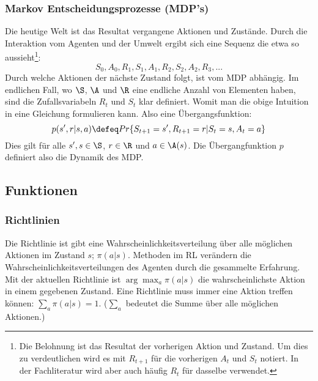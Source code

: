 \documentclass[a4paper,titlepage]{article}
\numberwithin{equation}{section} %
\begin{document}
\subsubsection{Markov Entscheidungsprozesse (MDP's)}
Die heutige Welt ist das Resultat vergangene Aktionen und Zustände. Durch die Interaktion vom Agenten und der Umwelt ergibt sich eine Sequenz die etwa so aussieht\footnote{Die Belohnung ist das Resultat der vorherigen Aktion und Zustand. Um dies zu verdeutlichen wird es mit $R_{t+1}$ für die vorherigen $A_t$ und $S_t$ notiert. In der Fachliteratur wird aber auch häufig $R_t$ für dasselbe verwendet.}:
\begin{equation} \label{eqn:sequenz}
S_{0}, A_{0}, R_{1}, S_{1}, A_{1}, R_{2}, S_{2}, A_{2}, R_{3}, ... \nonumber
\end{equation}
Durch welche Aktionen der nächste Zustand folgt, ist vom MDP abhängig. Im endlichen Fall, wo $\S$, $\A$ und $\R$ eine endliche Anzahl von Elementen haben, sind die Zufallsvariabeln $R_t$ und $S_t$ klar definiert. Womit man die obige Intuition in eine Gleichung formulieren kann. Also eine Übergangsfunktion:
\begin{equation} \label{eqn:mdp-übergang}
	p(s',r|s,a) \defeq Pr\{S_{t+1}=s', R_{t+1}=r|S_t=s,A_t=a\}
\end{equation}
Dies gilt für alle $s', s \in \S$, $r \in \R$ und $a \in \A(s)$. Die Übergangfunktion $p$ definiert also die Dynamik des MDP.

\subsection{Funktionen}
\subsubsection{Richtlinien}
Die Richtlinie ist gibt eine Wahrscheinlichkeitsverteilung über alle möglichen Aktionen im Zustand $s$; $\pi(a|s)$. Methoden im RL verändern die Wahrscheinlichkeitsverteilungen des Agenten durch die gesammelte Erfahrung.
Mit der aktuellen Richtlinie ist $\arg\max_{a}\pi(a|s)$ die wahrscheinlichste Aktion in einem gegebenen Zustand. Eine Richtlinie muss immer eine Aktion treffen können: $\sum_{a}\pi(a|s) = 1$. ($\sum_{a}$ bedeutet die Summe über alle möglichen Aktionen.)
\end{document}
